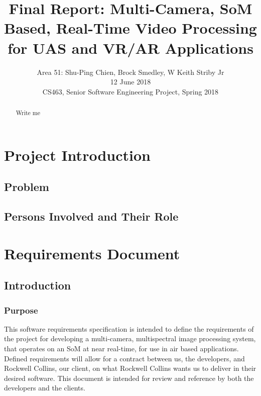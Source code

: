 \documentclass[letterpaper,10pt,serif,draftclsnofoot,onecolumn,compsoc,titlepage]{IEEEtran}
\title{Final Report: Multi-Camera, SoM Based, Real-Time Video Processing for UAS and VR/AR Applications}
\author{Area 51: Shu-Ping Chien, Brock Smedley, W Keith Striby Jr \\ 12 June 2018 \\ CS463, Senior Software Engineering Project, Spring 2018}
\begin{document}
\begin{titlepage}
\maketitle

\begin{abstract}

Write me \\


\thispagestyle{empty}
\end{abstract}
\end{titlepage}

\newpage
\tableofcontents

\newpage

\section{Project Introduction}

\subsection{Problem}

\subsection{Persons Involved and Their Role}

\newpage 

\section{Requirements Document}

\subsection{Introduction}

\subsubsection{Purpose}

This software requirements specification is intended to define the requirements of the 
project for developing a multi-camera, multispectral image processing system, that 
operates on an SoM at near real-time, for use in air based 
applications. Defined requirements will allow for a contract between us, the 
developers, and Rockwell Collins, our client, on what Rockwell Collins wants us to 
deliver in their desired software. This document is intended for review and reference 
by both the developers and the clients.\\
\end{document}
